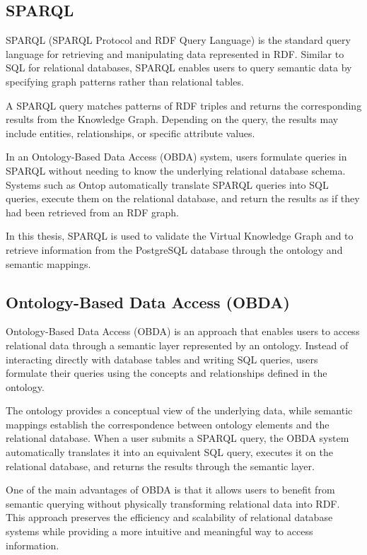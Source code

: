 \subsection{SPARQL}
SPARQL (SPARQL Protocol and RDF Query Language) is the standard query language for retrieving and manipulating data represented in RDF. Similar to SQL for relational databases, SPARQL enables users to query semantic data by specifying graph patterns rather than relational tables.

A SPARQL query matches patterns of RDF triples and returns the corresponding results from the Knowledge Graph. Depending on the query, the results may include entities, relationships, or specific attribute values.

In an Ontology-Based Data Access (OBDA) system, users formulate queries in SPARQL without needing to know the underlying relational database schema. Systems such as Ontop automatically translate SPARQL queries into SQL queries, execute them on the relational database, and return the results as if they had been retrieved from an RDF graph.

In this thesis, SPARQL is used to validate the Virtual Knowledge Graph and to retrieve information from the PostgreSQL database through the ontology and semantic mappings.

\subsection{Ontology-Based Data Access (OBDA)}
Ontology-Based Data Access (OBDA) is an approach that enables users to access relational data through a semantic layer represented by an ontology. Instead of interacting directly with database tables and writing SQL queries, users formulate their queries using the concepts and relationships defined in the ontology.

The ontology provides a conceptual view of the underlying data, while semantic mappings establish the correspondence between ontology elements and the relational database. When a user submits a SPARQL query, the OBDA system automatically translates it into an equivalent SQL query, executes it on the relational database, and returns the results through the semantic layer.

One of the main advantages of OBDA is that it allows users to benefit from semantic querying without physically transforming relational data into RDF. This approach preserves the efficiency and scalability of relational database systems while providing a more intuitive and meaningful way to access information.

